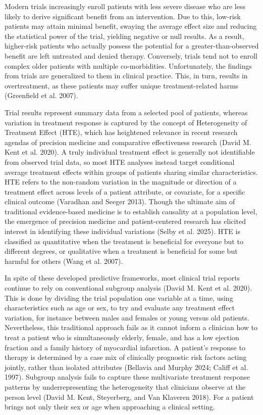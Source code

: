 \documentclass{article}
\begin{document}
Modern trials increasingly enroll patients with less severe disease who
are less likely to derive significant benefit from an intervention. Due
to this, low-risk patients may attain minimal benefit, swaying the
average effect size and reducing the statistical power of the trial,
yielding negative or null results. As a result, higher-risk patients who
actually possess the potential for a greater-than-observed benefit are
left untreated and denied therapy. Conversely, trials tend not to enroll
complex older patients with multiple co-morbidities. Unfortunately, the
findings from trials are generalized to them in clinical practice. This,
in turn, results in overtreatment, as these patients may suffer unique
treatment-related harms (Greenfield et al. 2007).

Trial results represent summary data from a selected pool of patients,
whereas variation in treatment response is captured by the concept of
Heterogeneity of Treatment Effect (HTE), which has heightened relevance
in recent research agendas of precision medicine and comparative
effectiveness research (David M. Kent et al. 2020). A truly individual
treatment effect is generally not identifiable from observed trial data,
so most HTE analyses instead target conditional average treatment
effects within groups of patients sharing similar characteristics. HTE
refers to the non-random variation in the magnitude or direction of a
treatment effect across levels of a patient attribute, or covariate, for
a specific clinical outcome (Varadhan and Seeger 2013). Though the
ultimate aim of traditional evidence-based medicine is to establish
causality at a population level, the emergence of precision medicine and
patient-centered research has elicited interest in identifying these
individual variations (Selby et al. 2025). HTE is classified as
quantitative when the treatment is beneficial for everyone but to
different degrees, or qualitative when a treatment is beneficial for
some but harmful for others (Wang et al. 2007).

In spite of these developed predictive frameworks, most clinical trial
reports continue to rely on conventional subgroup analysis (David M.
Kent et al. 2020). This is done by dividing the trial population one
variable at a time, using characteristics such as age or sex, to try and
evaluate any treatment effect variation, for instance between males and
females or young versus old patients. Nevertheless, this traditional
approach fails as it cannot inform a clinician how to treat a patient
who is simultaneously elderly, female, and has a low ejection fraction
and a family history of myocardial infarction. A patient's response to
therapy is determined by a case mix of clinically prognostic risk
factors acting jointly, rather than isolated attributes (Bellavia and
Murphy 2024; Califf et al. 1997). Subgroup analysis fails to capture
these multivariate treatment response patterns by underrepresenting the
heterogeneity that clinicians observe at the person level (David M.
Kent, Steyerberg, and Van Klaveren 2018). For a patient brings not only
their sex or age when approaching a clinical setting.
\end{document}
